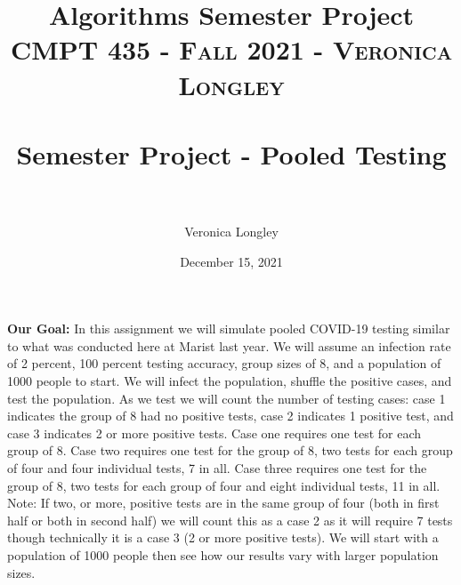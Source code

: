 \documentclass{article}
\title{\textbf{Algorithms Semester Project}}
\author{Veronica Longley }
\date{December 15, 2021}
\title{	
   \normalfont \normalsize 
   \textsc{CMPT 435 - Fall 2021 - Veronica Longley} \\[10pt] %
   \horrule{0.5pt} \\[0.25cm] 	%
   \huge Semester Project - Pooled Testing    	    \\ %
   \horrule{0.5pt} \\[0.25cm] 	%
}
\begin{document}
\lstset{numbers= left}
\lstset{language=Java}
\huge
\newcommand{\horrule}[1]{\rule{\linewidth}{#1}}

\maketitle{}


\pagebreak
\large
\textbf{Our Goal:}
In this assignment we will simulate pooled COVID-19 testing similar to what was conducted here at Marist last year. We will assume an infection rate of 2 percent, 100 percent testing accuracy, group sizes of 8, and a population of 1000 people to start. We will infect the population, shuffle the positive cases, and test the population. As we test we will count the number of testing cases: case 1 indicates the group of 8 had no positive tests, case 2 indicates 1 positive test, and case 3 indicates 2 or more positive tests. Case one requires one test for each group of 8. Case two requires one test for the group of 8, two tests for each group of four and four individual tests, 7 in all. Case three requires one test for the group of 8, two tests for each group of four and eight individual tests, 11 in all. Note: If two, or more, positive tests are in the same group of four (both in first half or both in second half) we will count this as a case 2 as it will require 7 tests though technically it is a case 3 (2 or more positive tests). We will start with a population of 1000 people then see how our results vary with larger population sizes. 

\small
\end{document}
